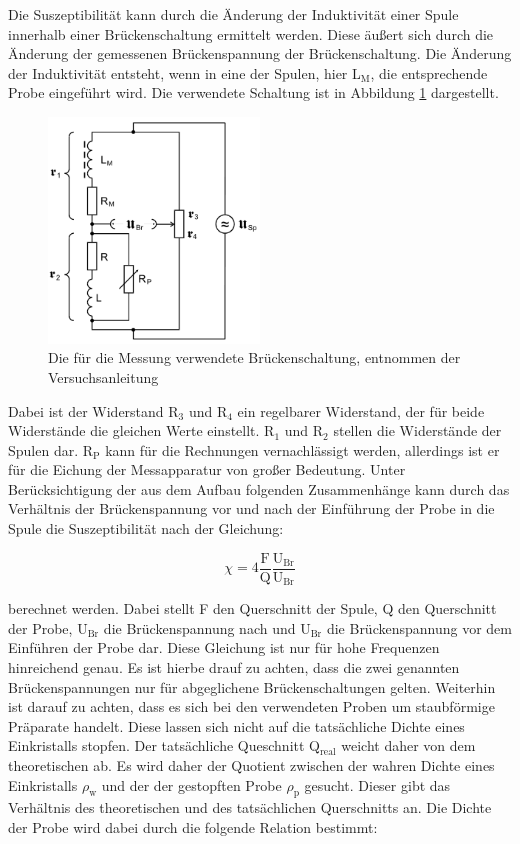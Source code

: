 Die Suszeptibilität kann durch die Änderung der Induktivität einer Spule innerhalb einer Brückenschaltung ermittelt werden.
Diese äußert sich durch die Änderung der gemessenen Brückenspannung der Brückenschaltung.
Die Änderung der Induktivität entsteht, wenn in eine der Spulen, hier L$_\text{M}$, die entsprechende Probe eingeführt wird.
Die verwendete Schaltung ist in Abbildung \ref{fig:Brückenschaltung} dargestellt.

\begin{figure}
  \centering
  \includegraphics[width=0.5\textwidth]{images/Brueckenschaltung.png}
  \caption{Die für die Messung verwendete Brückenschaltung, entnommen der Versuchsanleitung\cite[179]{sample}}
  \label{fig:Brückenschaltung}
\end{figure}

Dabei ist der Widerstand R$_3$ und R$_4$ ein regelbarer Widerstand, der für beide Widerstände die gleichen Werte einstellt.
R$_1$ und R$_2$ stellen die Widerstände der Spulen dar.
R$_\text{P}$ kann für die Rechnungen vernachlässigt werden, allerdings ist er für die Eichung der Messapparatur von großer Bedeutung.
Unter Berücksichtigung der aus dem Aufbau folgenden Zusammenhänge  kann durch das Verhältnis der Brückenspannung vor und nach der Einführung der Probe in die Spule die Suszeptibilität nach der Gleichung:

\begin{equation}
  \chi = 4 \frac{\text{F}}{\text{Q}} \frac{\text{U}_\text{Br}}{\text{U}_\text{Br}}
  \label{eqn:chi1}
\end{equation}

berechnet werden.
Dabei stellt F den Querschnitt der Spule, Q den Querschnitt der Probe, $\text{U}_\text{Br}$ die Brückenspannung nach und $\text{U}_\text{Br}$ die Brückenspannung vor dem Einführen der Probe dar.
Diese Gleichung ist nur für hohe Frequenzen hinreichend genau.
Es ist hierbe drauf zu achten, dass die zwei genannten Brückenspannungen nur für abgeglichene Brückenschaltungen gelten.
Weiterhin ist darauf zu achten, dass es sich bei den verwendeten Proben um staubförmige Präparate handelt.
Diese lassen sich nicht auf die tatsächliche Dichte eines Einkristalls stopfen.
Der tatsächliche Queschnitt Q$_\text{real}$ weicht daher von dem theoretischen ab.
Es wird daher der Quotient zwischen der wahren Dichte eines Einkristalls $\rho_\text{w}$ und der der gestopften Probe $\rho_\text{p}$ gesucht.
Dieser gibt das Verhältnis des theoretischen und des tatsächlichen Querschnitts an.
Die Dichte der Probe wird dabei durch die folgende Relation bestimmt:

